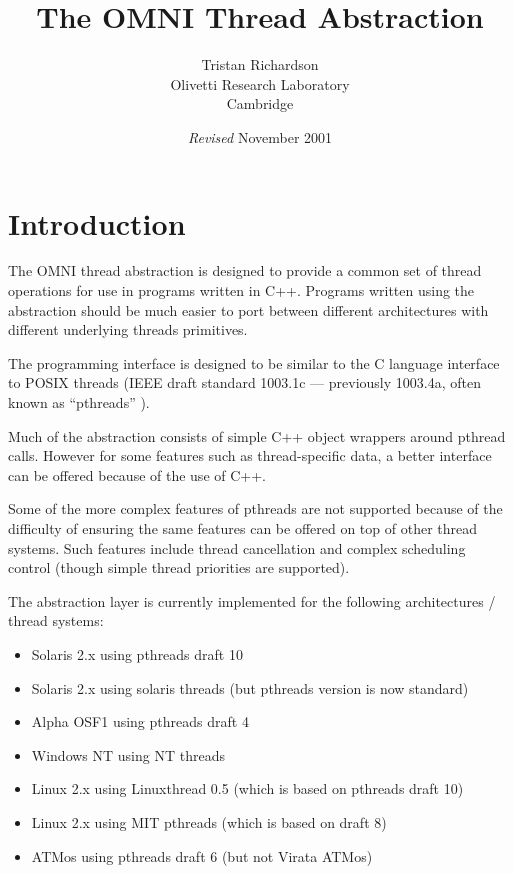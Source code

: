 \documentclass[11pt,twoside,a4paper]{article}
\title{The OMNI Thread Abstraction}
\author{Tristan Richardson\\
Olivetti Research Laboratory \\
Cambridge \\
}
\date{\textit{Revised} November 2001}
\begin{document}
\maketitle

\section{Introduction}

The OMNI thread abstraction is designed to provide a common set of
thread operations for use in programs written in C++.  Programs
written using the abstraction should be much easier to port between
different architectures with different underlying threads primitives.

The programming interface is designed to be similar to the C language
interface to POSIX threads (IEEE draft standard 1003.1c --- previously
1003.4a, often known as ``pthreads'' \cite{pthreads}).

Much of the abstraction consists of simple C++ object wrappers around
pthread calls.  However for some features such as thread-specific
data, a better interface can be offered because of the use of C++.

Some of the more complex features of pthreads are not supported
because of the difficulty of ensuring the same features can be offered
on top of other thread systems.  Such features include thread
cancellation and complex scheduling control (though simple thread
priorities are supported).

The abstraction layer is currently implemented for the following
architectures / thread systems:

\begin{itemize}

\item Solaris 2.x using pthreads draft 10
\item Solaris 2.x using solaris threads (but pthreads version is now standard)
\item Alpha OSF1 using pthreads draft 4
\item Windows NT using NT threads
\item Linux 2.x using Linuxthread 0.5 (which is based on pthreads draft 10)
\item Linux 2.x using MIT pthreads (which is based on draft 8)
\item ATMos using pthreads draft 6 (but not Virata ATMos)

\end{itemize}
\end{document}
